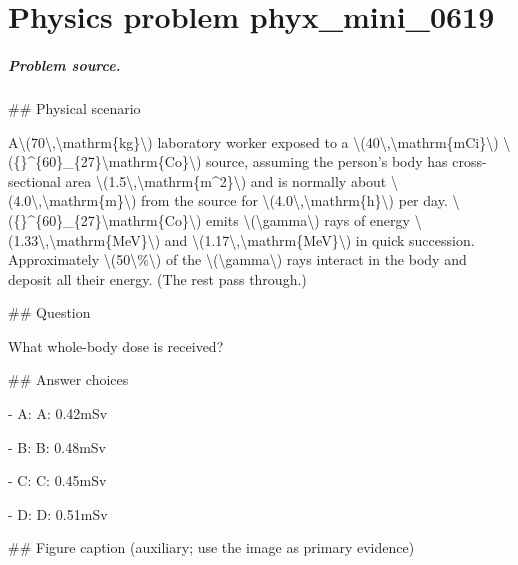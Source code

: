 
\chapter{Physics problem phyx\_mini\_0619}
\label{ch:PhyXMiniProblems_problem_phyx_mini_0619}

\paragraph{Problem source.}
\#\# Physical scenario

A\textbackslash{}(70\textbackslash{},\textbackslash{}mathrm\{kg\}\textbackslash{}) laboratory worker exposed to a \textbackslash{}(40\textbackslash{},\textbackslash{}mathrm\{mCi\}\textbackslash{}) \textbackslash{}(\{\}\textasciicircum{}\{60\}\_\{27\}\textbackslash{}mathrm\{Co\}\textbackslash{}) source, assuming the person's body has cross-sectional area \textbackslash{}(1.5\textbackslash{},\textbackslash{}mathrm\{m\textasciicircum{}2\}\textbackslash{}) and is normally about \textbackslash{}(4.0\textbackslash{},\textbackslash{}mathrm\{m\}\textbackslash{}) from the source for \textbackslash{}(4.0\textbackslash{},\textbackslash{}mathrm\{h\}\textbackslash{}) per day. \textbackslash{}(\{\}\textasciicircum{}\{60\}\_\{27\}\textbackslash{}mathrm\{Co\}\textbackslash{}) emits \textbackslash{}(\textbackslash{}gamma\textbackslash{}) rays of energy \textbackslash{}(1.33\textbackslash{},\textbackslash{}mathrm\{MeV\}\textbackslash{}) and \textbackslash{}(1.17\textbackslash{},\textbackslash{}mathrm\{MeV\}\textbackslash{}) in quick succession. Approximately \textbackslash{}(50\textbackslash{}\%\textbackslash{}) of the \textbackslash{}(\textbackslash{}gamma\textbackslash{}) rays interact in the body and deposit all their energy. (The rest pass through.)

\#\# Question

What whole-body dose is received?

\#\# Answer choices

- A: A: 0.42mSv

- B: B: 0.48mSv

- C: C: 0.45mSv

- D: D: 0.51mSv

\#\# Figure caption (auxiliary; use the image as primary evidence)

